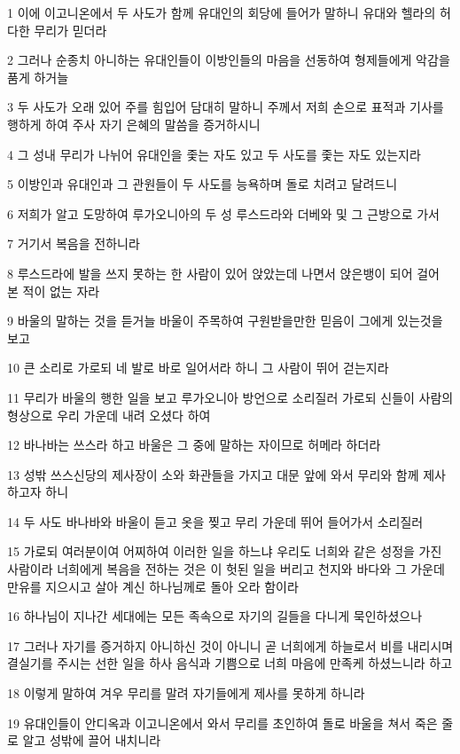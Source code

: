 \par 1 이에 이고니온에서 두 사도가 함께 유대인의 회당에 들어가 말하니 유대와 헬라의 허다한 무리가 믿더라
\par 2 그러나 순종치 아니하는 유대인들이 이방인들의 마음을 선동하여 형제들에게 악감을 품게 하거늘
\par 3 두 사도가 오래 있어 주를 힘입어 담대히 말하니 주께서 저희 손으로 표적과 기사를 행하게 하여 주사 자기 은혜의 말씀을 증거하시니
\par 4 그 성내 무리가 나뉘어 유대인을 좇는 자도 있고 두 사도를 좇는 자도 있는지라
\par 5 이방인과 유대인과 그 관원들이 두 사도를 능욕하며 돌로 치려고 달려드니
\par 6 저희가 알고 도망하여 루가오니아의 두 성 루스드라와 더베와 및 그 근방으로 가서
\par 7 거기서 복음을 전하니라
\par 8 루스드라에 발을 쓰지 못하는 한 사람이 있어 앉았는데 나면서 앉은뱅이 되어 걸어 본 적이 없는 자라
\par 9 바울의 말하는 것을 듣거늘 바울이 주목하여 구원받을만한 믿음이 그에게 있는것을 보고
\par 10 큰 소리로 가로되 네 발로 바로 일어서라 하니 그 사람이 뛰어 걷는지라
\par 11 무리가 바울의 행한 일을 보고 루가오니아 방언으로 소리질러 가로되 신들이 사람의 형상으로 우리 가운데 내려 오셨다 하여
\par 12 바나바는 쓰스라 하고 바울은 그 중에 말하는 자이므로 허메라 하더라
\par 13 성밖 쓰스신당의 제사장이 소와 화관들을 가지고 대문 앞에 와서 무리와 함께 제사하고자 하니
\par 14 두 사도 바나바와 바울이 듣고 옷을 찢고 무리 가운데 뛰어 들어가서 소리질러
\par 15 가로되 여러분이여 어찌하여 이러한 일을 하느냐 우리도 너희와 같은 성정을 가진 사람이라 너희에게 복음을 전하는 것은 이 헛된 일을 버리고 천지와 바다와 그 가운데 만유를 지으시고 살아 계신 하나님께로 돌아 오라 함이라
\par 16 하나님이 지나간 세대에는 모든 족속으로 자기의 길들을 다니게 묵인하셨으나
\par 17 그러나 자기를 증거하지 아니하신 것이 아니니 곧 너희에게 하늘로서 비를 내리시며 결실기를 주시는 선한 일을 하사 음식과 기쁨으로 너희 마음에 만족케 하셨느니라 하고
\par 18 이렇게 말하여 겨우 무리를 말려 자기들에게 제사를 못하게 하니라
\par 19 유대인들이 안디옥과 이고니온에서 와서 무리를 초인하여 돌로 바울을 쳐서 죽은 줄로 알고 성밖에 끌어 내치니라
